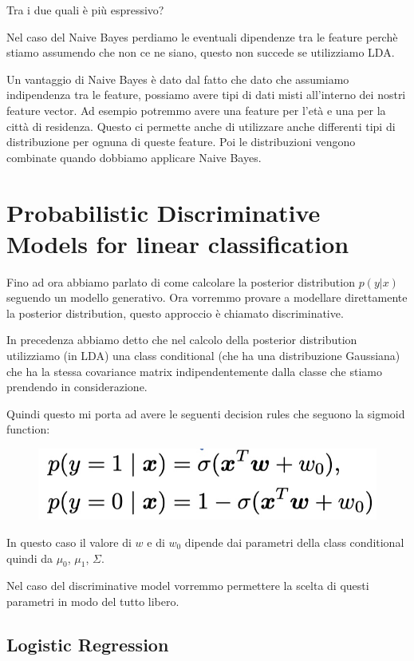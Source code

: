 \documentclass[14pt]{extreport}
\begin{document}
Tra i due quali è più espressivo?

Nel caso del Naive Bayes perdiamo le eventuali dipendenze tra le feature perchè stiamo assumendo che non ce ne siano, questo non succede se
utilizziamo LDA.

Un vantaggio di Naive Bayes è dato dal fatto che dato che assumiamo indipendenza tra le feature, possiamo avere tipi di dati misti all'interno dei
nostri feature vector. Ad esempio potremmo avere una feature per l'età e una per la città di residenza. Questo ci permette anche di utilizzare anche
differenti tipi di distribuzione per ognuna di queste feature. Poi le distribuzioni vengono combinate quando dobbiamo applicare Naive Bayes.

\section{Probabilistic Discriminative Models for linear classification}

Fino ad ora abbiamo parlato di come calcolare la posterior distribution $p(y|x)$ seguendo un modello generativo. Ora vorremmo provare a modellare
direttamente la posterior distribution, questo approccio è chiamato discriminative.

In precedenza abbiamo detto che nel calcolo della posterior distribution utilizziamo (in LDA) una class conditional (che ha una distribuzione
Gaussiana) che ha la stessa covariance matrix indipendentemente dalla classe che stiamo prendendo in considerazione.

Quindi questo mi porta ad avere le seguenti decision rules che seguono la sigmoid function:


\begin{figure}[H]
	\centering
	\includegraphics[width=0.4\linewidth]{187.jpeg}
\end{figure}

In questo caso il valore di $w$ e di $w_0$ dipende dai parametri della class conditional quindi da $\mu_0$, $\mu_1$, $\Sigma$.

Nel caso del discriminative model vorremmo permettere la scelta di questi parametri in modo del tutto libero.

\subsection{Logistic Regression}
\end{document}
